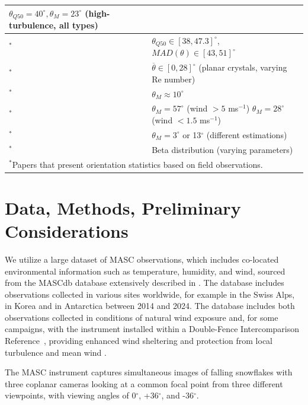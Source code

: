\documentclass[draft]{agujournal2019}
\begin{document}
\begin{table}
\begin{tabular}{l p{90mm}}
   $\theta_{Q50}= 40^\circ, \theta_{M} = 23^\circ$ (high-turbulence, all types) \\
   \hline
   \cite{Gergely_JGRA_2016}$^*$ &  $\theta_{Q50} \in [38,47.3]^\circ$, $MAD(\theta) \in [43,51]^\circ$ \\
   \hline
   \cite{Stout_ACP_2024}$^*$ &  $\overline{\theta} \in [0,28]^\circ$ (planar crystals, varying Re number)\\
   \hline
   \cite{Jiang_JAS_2019}$^*$ & $\theta_{M}\approx 10^\circ$ \\
   \hline
   \cite{Fitch_AMT_2021}$^*$ & $\theta_{M} = 57^\circ$ (wind $> 5$ ms$^{-1}$) \newline
   $\theta_{M} = 28^\circ$ (wind $< 1.5$ ms$^{-1}$) \\
   \hline
   \cite{Fitch_JGR_2022}$^*$ & $\theta_{M} = 3^\circ$ or  13$^\circ$ (different estimations)  \\
   \hline
   \cite{Schrom_JAS_2023}$^*$ & Beta distribution (varying parameters) \\
   \hline
    \multicolumn{2}{l}{$^{*}$Papers that present orientation statistics based on field observations.}
 \end{tabular}
 \end{table}

 
\section{Data, Methods, Preliminary Considerations}

We utilize a large dataset of MASC observations, which includes co-located environmental information such as temperature, humidity, and wind, sourced from the MASCdb database extensively described in \cite{Grazioli_SD_2022}. The database includes observations collected in various sites worldwide, for example in the Swiss Alps, in Korea and in Antarctica between 2014 and 2024. The database includes both observations collected in conditions of natural wind exposure and, for some campaigns, with the instrument installed within a Double-Fence Intercomparison Reference~\cite<DFIR, see for example>{Smith_HESS_2020}, providing enhanced wind sheltering and protection from local turbulence and mean wind . 

The MASC instrument captures simultaneous images of falling snowflakes with three coplanar cameras looking at a common focal point from three different viewpoints, with viewing angles of 0$^\circ$, +36$^\circ$, and -36$^\circ$.
\end{document}
